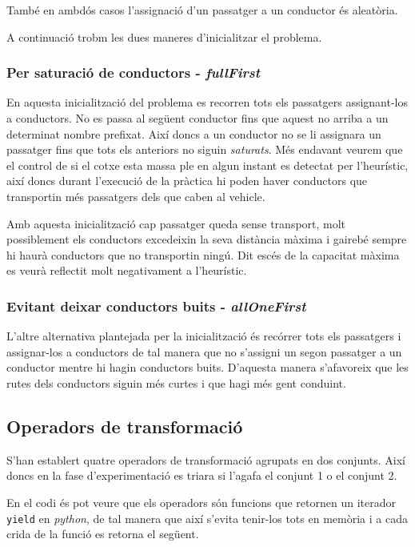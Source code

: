 També en ambdós casos l'assignació d'un passatger a un conductor és aleatòria.

A continuació trobm les dues maneres d'inicialitzar el problema.

\subsubsection{Per saturació de conductors - \emph{fullFirst}}
En aquesta inicialització del problema es recorren tots els passatgers assignant-los a conductors. No es passa
al següent conductor fins que aquest no arriba a un determinat nombre prefixat. Així doncs a un conductor no se
li assignara un passatger fins que tots els anteriors no siguin \emph{saturats}. Més endavant veurem
que el control de si el cotxe esta massa ple en algun instant es detectat per l'heurístic, així doncs
durant l'execució de la pràctica hi poden haver conductors que transportin més passatgers dels que
caben al vehicle.

Amb aquesta inicialització cap passatger queda sense transport, molt possiblement els conductors excedeixin
la seva distància màxima i gairebé sempre hi haurà conductors que no transportin ningú.
Dit escés de la capacitat màxima es veurà reflectit molt negativament a l'heurístic.

\subsubsection{Evitant deixar conductors buits - \emph{allOneFirst}}
L'altre alternativa plantejada per la inicialització és recórrer tots els passatgers i assignar-los a conductors
de tal manera que no s'assigni un segon passatger a un conductor mentre hi hagin conductors buits.
D'aquesta manera s'afavoreix que les rutes dels conductors siguin més curtes i que hagi més
gent conduint.

\subsection{Operadors de transformació}
S'han establert quatre operadors de transformació agrupats en dos conjunts. Així doncs en la fase d'experimentació
es triara si l'agafa el conjunt 1 o el conjunt 2.

En el codi és pot veure que els operadors són funcions que retornen un iterador \texttt{yield} en \emph{python},
de tal manera que així s'evita tenir-los tots en memòria i a cada crida de la funció es retorna el següent.

